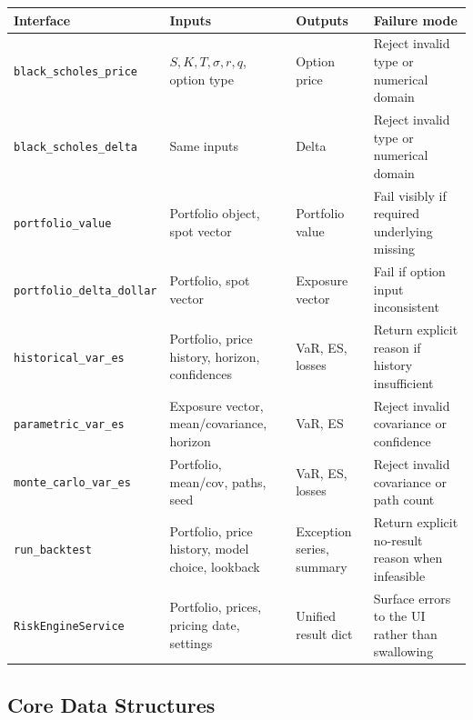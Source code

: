 \documentclass[11pt]{article}
\newcommand{\code}[1]{\texttt{#1}}
\begin{document}
\begin{center}
\begin{tabular}{L{3.5cm}L{4.5cm}L{3.0cm}L{2.5cm}}
\toprule
\textbf{Interface} & \textbf{Inputs} & \textbf{Outputs} & \textbf{Failure mode} \\
\midrule
\code{black\_scholes\_price} & $S,K,T,\sigma,r,q$, option type & Option price & Reject invalid type or numerical domain \\
\code{black\_scholes\_delta} & Same inputs & Delta & Reject invalid type or numerical domain \\
\code{portfolio\_value} & Portfolio object, spot vector & Portfolio value & Fail visibly if required underlying missing \\
\code{portfolio\_delta\_\allowbreak dollar} & Portfolio, spot vector & Exposure vector & Fail if option input inconsistent \\
\code{historical\_var\_es} & Portfolio, price history, horizon, confidences & VaR, ES, losses & Return explicit reason if history insufficient \\
\code{parametric\_var\_es} & Exposure vector, mean/covariance, horizon & VaR, ES & Reject invalid covariance or confidence \\
\code{monte\_carlo\_var\_es} & Portfolio, mean/cov, paths, seed & VaR, ES, losses & Reject invalid covariance or path count \\
\code{run\_backtest} & Portfolio, price history, model choice, lookback & Exception series, summary & Return explicit no-result reason when infeasible \\
\code{RiskEngineService} & Portfolio, prices, pricing date, settings & Unified result dict & Surface errors to the UI rather than swallowing \\
\bottomrule
\end{tabular}
\end{center}

\subsection{Core Data Structures}
\end{document}
